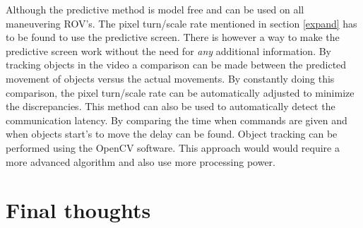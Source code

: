 Although the predictive method is model free and can be used on all maneuvering ROV's. The pixel turn/scale rate mentioned in section \ref{expand} has to be found to use the predictive screen. There is however a way to make the predictive screen work without the need for \textit{any} additional information. By tracking objects in the video a comparison can be made between the predicted movement of objects versus the actual movements. By constantly doing this comparison, the pixel turn/scale rate can be automatically adjusted to minimize the discrepancies. This method can also be used to automatically detect the communication latency. By comparing the time when commands are given and when objects start's to move the delay can be found. Object tracking can be performed using the OpenCV software. This approach would would require a more advanced algorithm and also use more processing power.

\section{Final thoughts}

